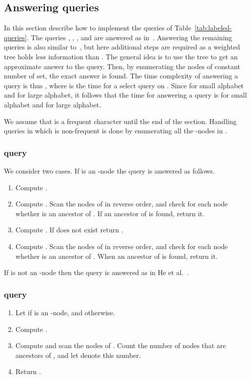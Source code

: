 \documentclass[12pt]{article}
\begin{document}
\subsection{Answering queries}
In this section describe how to implement the queries of
Table~\ref{tab:labeled-queries}.
The queries , , ,
 and  are answered as in~\cite{HeMZ12}.
Answering the remaining queries is also similar to~\cite{HeMZ12},
but here additional steps are required as a weighted tree 
holds less information than .
The general idea is to use the tree  to get an approximate
answer to the query. Then, by enumerating the nodes of constant number
of  set, the exact answer is found.
The time complexity of answering a query is thus ,
where  is the time for a select query on .
Since  for small alphabet
and  for large alphabet,
it follows that the time for answering a query is  for small alphabet
and  for large alphabet.

We assume that  is a frequent character until the end of the section.
Handling queries in which  is non-frequent is done by enumerating all
the -nodes in .

\subsubsection{ query}
We consider two cases.
If  is an -node the query is answered as follows.
\begin{enumerate}
\item Compute .
\item Compute . Scan the nodes of  in reverse order,
and check for each node  whether  is an ancestor of .
If an ancestor of  is found, return it.
\item
Compute .
If  does not exist return .
\item
Compute . Scan the nodes of  in reverse order,
and check for each node  whether  is an ancestor of .
When an ancestor of  is found, return it.
\end{enumerate}
If  is not an -node then the query is answered as
in He et al.~\cite{HeMZ12}.




\subsubsection{ query}
\begin{enumerate}
\item
Let  if  is an -node, and  otherwise.
\item
Compute .
\item
Compute  and scan the nodes of .
Count the number of nodes that are ancestors of ,
and let  denote this number.
\item
Return .
\end{enumerate}
\end{document}
